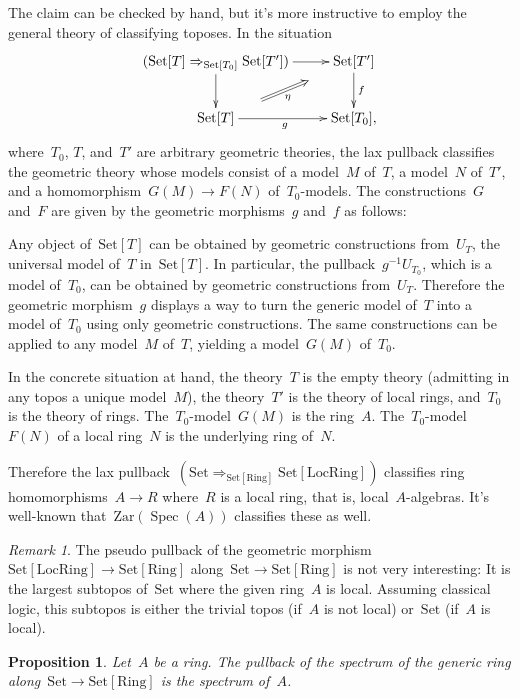 \documentclass[10pt,reqno,a4paper]{amsbook}
\makeatletter
\theoremstyle{definition}
\theoremstyle{plain}
\newtheorem{prop}[defn]{Proposition}
\theoremstyle{remark}
\newtheorem{rem}[defn]{Remark}
\newcommand{\Set}{\mathrm{Set}}
\newcommand{\Zar}{\mathrm{Zar}}
\newcommand{\Ring}{\mathrm{Ring}}
\newcommand{\LocRing}{\mathrm{LocRing}}
\DeclareMathOperator{\Spec}{Spec}
\newcommand{\?}{\,{:}\,}
\renewcommand{\_}{\mathpunct{.}\,}
\renewenvironment{proof}[1][\proofname]{\par
  \pushQED{\qed}%
  \normalfont \topsep6\p@\@plus6\p@\relax
  \trivlist
  \item[\hskip\labelsep
        \itshape
    #1\@addpunct{.}]\ignorespaces
}{%
  \popQED\endtrivlist\@endpefalse
}
\makeatother
\begin{document}
\begin{proof}The claim can be checked by hand, but it's more instructive to
employ the general theory of classifying toposes. In the situation
\[ \xymatrix{
  (\Set[T] \Rightarrow_{\Set[T_0]} \Set[T']) \ar[r] \ar[d] & \Set[T'] \ar[d]^f \\
  \Set[T] \ar[r]_g \ar@{}[ur]^(.3){}="a"^(.7){}="b" \ar@{=>}_\eta "a";"b" & \Set[T_0],
} \]
where~$T_0$, $T$, and~$T'$ are arbitrary geometric theories, the lax pullback
classifies the geometric theory whose models consist of a model~$M$ of~$T$, a
model~$N$ of~$T'$, and a homomorphism~$G(M) \to F(N)$ of~$T_0$-models. The
constructions~$G$ and~$F$ are given by the geometric morphisms~$g$ and~$f$ as
follows:

Any object of~$\Set[T]$ can be obtained by geometric constructions from~$U_T$,
the universal model of~$T$ in~$\Set[T]$. In particular, the pullback~$g^{-1}
U_{T_0}$, which is a model of~$T_0$, can be obtained by geometric constructions
from~$U_T$. Therefore the geometric morphism~$g$ displays a way to turn the
generic model of~$T$ into a model of~$T_0$ using only geometric constructions.
The same constructions can be applied to any model~$M$ of~$T$, yielding a
model~$G(M)$ of~$T_0$.

In the concrete situation at hand, the theory~$T$ is the empty theory
(admitting in any topos a unique model~$M$), the theory~$T'$ is the theory of local
rings, and~$T_0$ is the theory of rings. The~$T_0$-model~$G(M)$ is the
ring~$A$. The~$T_0$-model~$F(N)$ of a local ring~$N$ is the underlying ring
of~$N$.

Therefore the lax pullback~$(\Set \Rightarrow_{\Set[\Ring]} \Set[\LocRing])$
classifies ring homomorphisms~$A \to R$ where~$R$ is a local ring, that is,
local~$A$-algebras. It's well-known that~$\Zar(\Spec(A))$ classifies these as
well.
\end{proof}

\begin{rem}The pseudo pullback of the geometric morphism~$\Set[\LocRing] \to
\Set[\Ring]$ along~$\Set \to \Set[\Ring]$ is not very interesting: It is the
largest subtopos of~$\Set$ where the given ring~$A$ is local. Assuming
classical logic, this subtopos is either the trivial topos (if~$A$ is not
local) or~$\Set$ (if~$A$ is local).\end{rem}

\begin{prop}\label{prop:spectrum-as-pullback}
Let~$A$ be a ring. The pullback of the spectrum of the generic ring
along~$\Set \to \Set[\Ring]$ is the spectrum of~$A$.
\end{prop}
\end{document}

